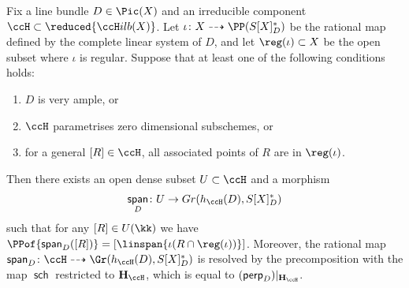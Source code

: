 \documentclass[12pt,a4paper]{article}
\newcommand{\usualHilb}{{\ccH}ilb}
\DeclareMathOperator{\sch}{\mathsf {sch}}
\DeclareMathOperator{\spanmap}{\mathsf {span}}
\DeclareMathOperator{\perpmap}{\mathsf {perp}}
\begin{document}
\begin{prop}
   \label{prop_linear_span_map}
   Fix a line bundle $D\in \Pic(X)$
      and an irreducible component
      $\ccH\subset \reduced{\usualHilb(X)}$.
   Let $\iota\colon X \dashrightarrow \PP(S[X]_D^*)$
      be the rational map defined by the complete linear system of $D$,
      and let $\reg(\iota) \subset X$ be the open subset where $\iota$ is regular.
   Suppose that at least one of the following conditions holds:
   \begin{enumerate}
    \item
      \label{item_lin_span_very_ample}
    $D$ is very ample, or
    \item
      \label{item_lin_span_zero_dim}
     $\ccH$ parametrises zero dimensional subschemes, or
    \item
      \label{item_lin_span_associated_pts}
    for a general $[R] \in \ccH$, all associated points of $R$ are in $\reg(\iota)$.
   \end{enumerate}
   Then there exists an open dense subset $U\subset \ccH$
   and a morphism
   \[
      \spanmap_D\colon U\to Gr(h_{\ccH}(D), S[X]_D^*)
    \]
     such that for any $[R]\in U(\kk)$ we have
     $\PPof{\spanmap_D([R])}= \left[\linspan{\iota(R\cap \reg(\iota))}\right]$.
     Moreover,
        the rational map
      $\spanmap_D\colon \ccH \dashrightarrow \Gr(h_{\ccH}(D), S[X]_D^*)$
      is resolved by the precomposition with the map
      $\sch$ restricted to $\mathbf{H}_{\ccH}$, which is equal to $(\perpmap_D)|_{\mathbf{H}_{\ccH}}$.
\end{prop}
\end{document}
